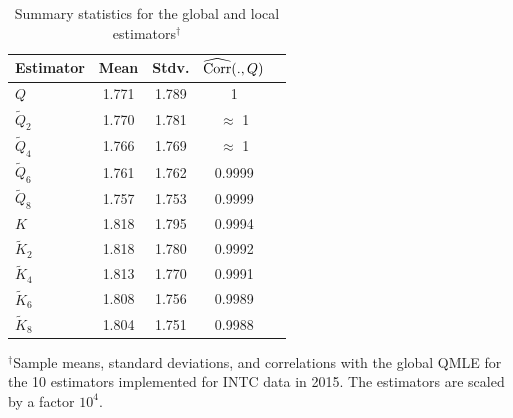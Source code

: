 \documentclass[11pt]{article}
\numberwithin{equation}{section}
\theoremstyle{plain}
\theoremstyle{remark}
\begin{document}
\begin{table}[]
\centering
\caption{Summary statistics for the global and local estimators$^\dag$}
\label{tableEstEmp}
\begin{tabular}{lcccc}
\toprule
\toprule
Estimator   & Mean & Stdv. & $\widehat{\textnormal{Corr}}(.,Q)$  \\
\toprule
$Q$ & 1.771  & 1.789& 1  \\
$\tilde{Q}_2$ & 1.770  & 1.781  & $\approx$ 1\\
$\tilde{Q}_4$ & 1.766  & 1.769  & $\approx$ 1  \\
$\tilde{Q}_6$ & 1.761  & 1.762  & 0.9999  \\
$\tilde{Q}_8$ & 1.757  & 1.753  & 0.9999  \\
$K$ & 1.818  & 1.795  & 0.9994  \\
$\tilde{K}_2$ & 1.818  & 1.780  & 0.9992\\
$\tilde{K}_4$ & 1.813  & 1.770  & 0.9991  \\
$\tilde{K}_6$ & 1.808  & 1.756  & 0.9989  \\
$\tilde{K}_8$ & 1.804  & 1.751  & 0.9988  \\


\bottomrule
\end{tabular}

\scriptsize $^\dag$Sample means, standard deviations, and correlations with the global QMLE for the 10 estimators implemented for INTC data in 2015. The estimators are scaled by a factor $10^4$. 

\end{table}

\newpage
\newpage
\clearpage
\end{document}
